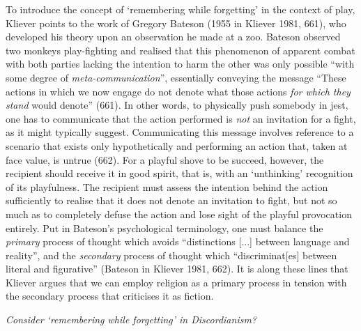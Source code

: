 \documentclass[Draft.tex]{subfiles}
\begin{document}
To introduce the concept of `remembering while forgetting'
in the context of play, Kliever points to the work of
Gregory Bateson (1955 in Kliever 1981, 661),
who developed his theory upon an observation he made at a zoo.
Bateson observed two monkeys play-fighting and realised that
this phenomenon of apparent combat with both parties lacking
the intention to harm the other was only possible
``with some degree of \textit{meta-communication}'',
essentially conveying the message
``These actions in which we now engage do not denote
what those actions \textit{for which they stand} would denote'' (661).
In other words, to physically push somebody in jest,
one has to communicate that the action performed
is \textit{not} an invitation for a fight, as it might typically suggest.
Communicating this message involves reference to
a scenario that exists only hypothetically and
performing an action that, taken at face value, is untrue (662).
For a playful shove to be succeed, however,
the recipient should receive it in good spirit, that is,
with an `unthinking' recognition of its playfulness.
The recipient must assess the intention behind the action sufficiently
to realise that it does not denote an invitation to fight,
but not so much as to completely defuse the action
and lose sight of the playful provocation entirely.
Put in Bateson's psychological terminology,
one must balance the \textit{primary} process of thought which
avoids ``distinctions [...] between language and reality'',
and the \textit{secondary} process of thought
which ``discriminat[es] between literal and figurative''
(Bateson in Kliever 1981, 662).
It is along these lines that Kliever argues that we can
employ religion as a primary process in tension with
the secondary process that criticises it as fiction.

\textit{Consider `remembering while forgetting' in Discordianism?}
\end{document}
